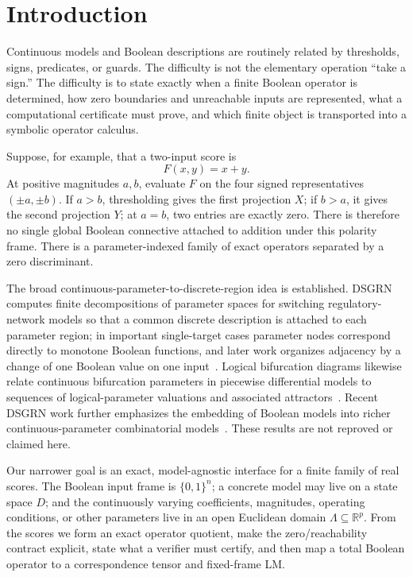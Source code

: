 \documentclass[11pt]{article}
\theoremstyle{definition}
\theoremstyle{remark}
\newcommand{\R}{\mathbb{R}}
\newcommand{\B}{\{0,1\}}
\begin{document}
\section{Introduction}

Continuous models and Boolean descriptions are routinely related by thresholds, signs, predicates, or guards. The difficulty is not the elementary operation ``take a sign.'' The difficulty is to state exactly when a finite Boolean operator is determined, how zero boundaries and unreachable inputs are represented, what a computational certificate must prove, and which finite object is transported into a symbolic operator calculus.

Suppose, for example, that a two-input score is
\[
 F(x,y)=x+y.
\]
At positive magnitudes $a,b$, evaluate $F$ on the four signed representatives $(\pm a,\pm b)$. If $a>b$, thresholding gives the first projection $X$; if $b>a$, it gives the second projection $Y$; at $a=b$, two entries are exactly zero. There is therefore no single global Boolean connective attached to addition under this polarity frame. There is a parameter-indexed family of exact operators separated by a zero discriminant.

The broad continuous-parameter-to-discrete-region idea is established. DSGRN computes finite decompositions of parameter spaces for switching regulatory-network models so that a common discrete description is attached to each parameter region; in important single-target cases parameter nodes correspond directly to monotone Boolean functions, and later work organizes adjacency by a change of one Boolean value on one input~\cite{CumminsEtAl2018,Gedeon2020,CrawfordKahrlEtAl2022}. Logical bifurcation diagrams likewise relate continuous bifurcation parameters in piecewise differential models to sequences of logical-parameter valuations and associated attractors~\cite{AbouJaoudeMonteiro2019}. Recent DSGRN work further emphasizes the embedding of Boolean models into richer continuous-parameter combinatorial models~\cite{CumminsEtAl2026}. These results are not reproved or claimed here.

Our narrower goal is an exact, model-agnostic interface for a finite family of real scores. The Boolean input frame is $\B^n$; a concrete model may live on a state space $D$; and the continuously varying coefficients, magnitudes, operating conditions, or other parameters live in an open Euclidean domain $\Lambda\subseteq\R^p$. From the scores we form an exact operator quotient, make the zero/reachability contract explicit, state what a verifier must certify, and then map a total Boolean operator to a correspondence tensor and fixed-frame LM.
\end{document}
